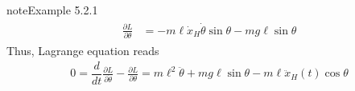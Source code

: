 \documentclass[letterpaper,10pt,english]{jupyterBook}
\begin{document}
\begin{sphinxadmonition}{note}{Example 5.2.1}
\begin{equation*}
\begin{split}
\begin{aligned}
  \frac{\partial L}{\partial \theta}
  & = - m \ell \dot{x}_H \dot{\theta} \sin \theta - m g \ell \sin \theta
\end{aligned}\end{split}
\end{equation*}
\sphinxAtStartPar
Thus, Lagrange equation reads
\begin{equation*}
\begin{split}
  0 = \dfrac{d}{d t} \frac{\partial L}{\partial \dot{\theta}} - \frac{\partial L}{\partial \theta}
    = m \ell^2 \ddot{\theta} + m g \ell \sin \theta - m \ell \ddot{x}_H (t) \cos \theta
\end{split}
\end{equation*}
\sphinxAtStartPar
{}
\end{sphinxadmonition}

\sphinxstepscope
\end{document}
